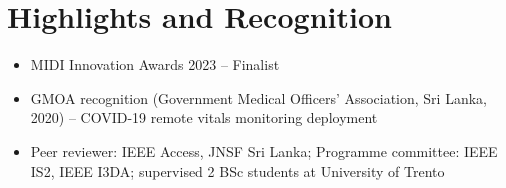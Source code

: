 \documentclass[11pt]{article}
\begin{document}
\section*{Highlights and Recognition}
\begin{itemize}[leftmargin=2em, itemsep=-0.3em, topsep=0.2em]
    \item MIDI Innovation Awards 2023 -- Finalist
    \item GMOA recognition (Government Medical Officers' Association, Sri Lanka, 2020) -- COVID-19 remote vitals monitoring deployment
    \item Peer reviewer: IEEE Access, JNSF Sri Lanka; Programme committee: IEEE IS2, IEEE I3DA; supervised 2 BSc students at University of Trento
\end{itemize}
\end{document}
